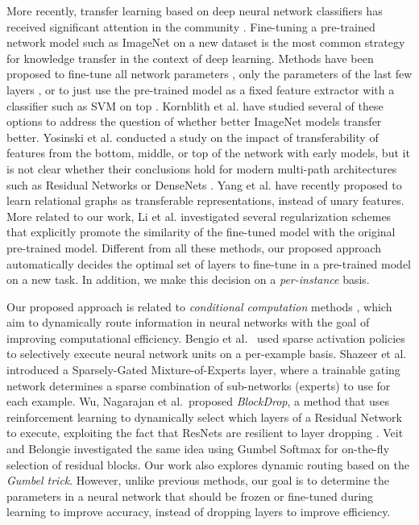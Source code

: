 \documentclass[10pt,twocolumn,letterpaper]{article}
\begin{document}
More recently, transfer learning based on deep neural network classifiers has received significant attention in the community \cite{ganin2016domain, chen2015deep, dlid, co-regularized,ge2017borrowing}. Fine-tuning a pre-trained network model such as ImageNet on a new dataset is the most common strategy for knowledge transfer in the context of deep learning. Methods have been proposed to fine-tune all network parameters \cite{girshick2014rich}, only the parameters of the last few layers \cite{long2015learninglastfew}, or to just use the pre-trained model as a fixed feature extractor with a classifier such as SVM on top \cite{sharif2014cnn}. Kornblith et al. \cite{kornblith2018better} have studied several of these options to address the question of whether better ImageNet models transfer better. Yosinski et al. \cite{yosinski2014transferable} conducted a study on the impact of transferability of features from the bottom, middle, or top of the network with early models, but it is not clear whether their conclusions hold for modern multi-path architectures such as Residual Networks \cite{he2016deep} or DenseNets \cite{huang2017densely}. Yang et al. \cite{yang2018glomo} have recently proposed to learn relational graphs as transferable representations, instead of unary features. More related to our work,  Li et al. \cite{li2018explicit} investigated several regularization schemes that explicitly promote the similarity of the fine-tuned model with the original pre-trained model. Different from all these methods, our proposed approach automatically decides the optimal set of layers to fine-tune in a pre-trained model on a new task. In addition, we make this decision on a {\em per-instance} basis.  

\vspace{0.05in}{\bf Dynamic Routing.} Our proposed approach is related to {\em conditional computation} methods \cite{bengio2013estimating,liu2017dynamic,figurnov2017spatially}, which
aim to dynamically route information in neural networks with the goal of improving computational efficiency. Bengio et al.~\cite{bengio2015conditional} used sparse activation policies to selectively execute neural network units on a per-example basis. Shazeer et al.~\cite{shazeer2017outrageously} introduced a Sparsely-Gated Mixture-of-Experts layer, where a trainable gating network determines a sparse combination of sub-networks (experts) to use for each example. Wu, Nagarajan et al.~proposed {\em BlockDrop}\cite{wu2018blockdrop}, a method that uses reinforcement learning to dynamically select which layers of a Residual Network to execute, exploiting the fact that ResNets are resilient to layer dropping \cite{veit2016residual}. Veit and Belongie \cite{veit2018convolutional} investigated the same idea using Gumbel Softmax \cite{jang2016categorical} for on-the-fly selection of residual blocks. Our work also %
explores 
dynamic routing based on the {\em Gumbel trick}. However, unlike previous methods, our goal is to determine the parameters in a neural network that should be frozen or fine-tuned during learning to improve accuracy, instead of dropping layers to improve efficiency.
\end{document}
